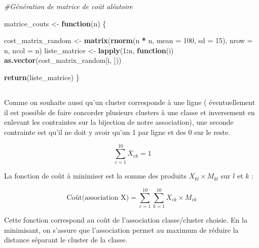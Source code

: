 \documentclass[
]{article}
\newenvironment{Shaded}{\begin{snugshade}}{\end{snugshade}}
\newcommand{\AttributeTok}[1]{\textcolor[rgb]{0.13,0.29,0.53}{#1}}
\newcommand{\CommentTok}[1]{\textcolor[rgb]{0.56,0.35,0.01}{\textit{#1}}}
\newcommand{\ControlFlowTok}[1]{\textcolor[rgb]{0.13,0.29,0.53}{\textbf{#1}}}
\newcommand{\DecValTok}[1]{\textcolor[rgb]{0.00,0.00,0.81}{#1}}
\newcommand{\FunctionTok}[1]{\textcolor[rgb]{0.13,0.29,0.53}{\textbf{#1}}}
\newcommand{\NormalTok}[1]{#1}
\newcommand{\OtherTok}[1]{\textcolor[rgb]{0.56,0.35,0.01}{#1}}
\newcommand{\SpecialCharTok}[1]{\textcolor[rgb]{0.81,0.36,0.00}{\textbf{#1}}}
\begin{document}
\begin{Shaded}
\begin{Highlighting}[]
\CommentTok{\#Génération de matrice de coût aléatoire}

\NormalTok{matrice\_couts }\OtherTok{\textless{}{-}} \ControlFlowTok{function}\NormalTok{(n) \{}
  
\NormalTok{  cost\_matrix\_random }\OtherTok{\textless{}{-}} \FunctionTok{matrix}\NormalTok{(}\FunctionTok{rnorm}\NormalTok{(n }\SpecialCharTok{*}\NormalTok{ n, }\AttributeTok{mean =} \DecValTok{100}\NormalTok{, }\AttributeTok{sd =} \DecValTok{15}\NormalTok{), }\AttributeTok{nrow =}\NormalTok{ n, }\AttributeTok{ncol =}\NormalTok{ n)}
\NormalTok{  liste\_matrice }\OtherTok{\textless{}{-}} \FunctionTok{lapply}\NormalTok{(}\DecValTok{1}\SpecialCharTok{:}\NormalTok{n, }\ControlFlowTok{function}\NormalTok{(i) }\FunctionTok{as.vector}\NormalTok{(cost\_matrix\_random[i, ]))}
  
  \FunctionTok{return}\NormalTok{(liste\_matrice)}
\NormalTok{\}}
\end{Highlighting}
\end{Shaded}

\hypertarget{section-8}{%
\subsection{}\label{section-8}}

Comme on souhaite aussi qu'un cluster corresponde à une ligne (
éventuellement il est possible de faire concorder plusieurs clusters à
une classe et inversement en enlevant les contraintes sur la bijection
de notre association), une seconde contrainte est qu'il ne doit y avoir
qu'un 1 par ligne et des 0 sur le reste.

\[
\ \sum_{c=1}^{10} X_{ck} = 1
\]

La fonction de coût à minimiser est la somme des produits
\(X_{kl} \times M_{kl}\) sur \(l\) et \(k\) :

\[
\text{Coût(association X)} = \sum_{c=1}^{10} \sum_{k=1}^{10} X_{ck} \times M_{ck}
\]

Cette fonction correspond au coût de l'association classe/cluster
choisie. En la minimisant, on s'assure que l'association permet au
maximum de réduire la distance séparant le cluster de la classe.

\hypertarget{section-9}{%
\subsection{}\label{section-9}}
\end{document}
